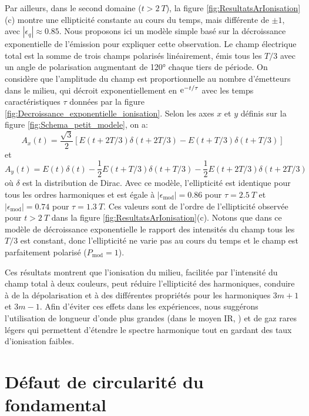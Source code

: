 Par ailleurs, dans le second domaine ($t > 2 \: T$), la figure \ref{fig:ResultatsArIonisation}(c) montre une ellipticité constante au cours du temps, mais différente de $\pm 1$, avec $|\epsilon_q| \approx 0.85$. Nous proposons ici un modèle simple basé sur la décroissance exponentielle de l'émission pour expliquer cette observation. Le champ électrique total est la somme de trois champs polarisés linéairement, émis tous les $T/3$ avec un angle de polarisation augmentant de 120° chaque tiers de période. On considère que l'amplitude du champ est proportionnelle au nombre d'émetteurs dans le milieu, qui décroit exponentiellement en $\mathrm{e}^{-t/\tau}$ avec les temps caractéristiques $\tau$ données par la figure \ref{fig:Decroissance_exponentielle_ionisation}. Selon les axes $x$ et $y$ définis sur la figure \ref{fig:Schema_petit_modele}, on a:
\begin{equation}
A_x (t) = \frac{\sqrt{3}}{2} \left[ E(t+2T/3) \delta(t+2T/3) - E(t+T/3) \delta(t+T/3) \right]
\end{equation}
et
\begin{equation}
A_y (t) = E(t) \delta(t) - \frac{1}{2} E(t+T/3) \delta(t+T/3) - \frac{1}{2} E(t+2T/3) \delta(t+2T/3) 
\end{equation}
où $\delta$ est la distribution de Dirac. Avec ce modèle, l'ellipticité est identique pour tous les ordres harmoniques et est égale à $|\epsilon_{\text{mod}}| = 0.86$ pour $\tau = 2.5 \: T$ et $|\epsilon_{\text{mod}}| = 0.74$ pour $\tau = 1.3 \: T$. Ces valeurs sont de l'ordre de l'ellipticité observée pour $t > 2 \: T$ dans la figure \ref{fig:ResultatsArIonisation}(c). Notons que dans ce modèle de décroissance exponentielle le rapport des intensités du champ tous les $T/3$ est constant, donc l'ellipticité ne varie pas au cours du temps et le champ est parfaitement polarisé ($P_{\text{mod}} = 1$).

Ces résultats montrent que l'ionisation du milieu, facilitée par l'intensité du champ total à deux couleurs, peut réduire l'ellipticité des harmoniques, conduire à de la dépolarisation et à des différentes propriétés pour les harmoniques $3m+1$ et $3m-1$. Afin d'éviter ces effets dans les expériences, nous suggérons l'utilisation de longueur d'onde plus grandes (dans le moyen IR, ) et de gaz rares légers qui permettent d'étendre le spectre harmonique tout en gardant des taux d'ionisation faibles.

\section{Défaut de circularité du fondamental}

